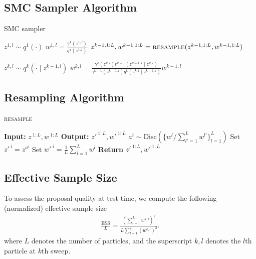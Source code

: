 \documentclass[anonymous=false, %
               format=acmsmall, %
               review=true, %
               screen=true, %
               nonacm=true]{acmart}
\theoremstyle{definition}
\begin{document}
\subsection{SMC Sampler Algorithm}
\label{appendix:smc-alg}
\begin{algorithm}[!h]
  \caption{SMC sampler}
  \label{alg:smcs}
\begin{algorithmic}[1]
    \small
        \State $z^{1,l} \sim q^1(\cdot)$
        \State $w^{1,l} = \frac{\gamma^1(z^{1,l})}{q^1(z^{1,l})}$
    \EndFor
      \State$z^{k-1,1:L}, w^{k-1,1:L}=\textsc{resample}(z^{k-1,1:L}, w^{k-1,1:L})$

          \State $z^{k,l} \sim q^k(\cdot \mid z^{k-1,l})$\label{line:apg-propose}
          \State $w^{k,l} = \frac{\gamma^k(z^{k,l}) r^{k-1}(z^{k-1,l} \mid z^{k,l})}{\gamma^{k-1}(z^{k-1,l}) q^k(z^{k,l} \mid z^{k-1,l})}w^{k-1,l}$
      \EndFor
    \EndFor
\end{algorithmic}
\end{algorithm}

\subsection{Resampling Algorithm}
\label{appendix:resample-alg}
\begin{algorithm}[!h]
  \caption{\textsc{resample}}
  \label{alg:resample}
\begin{algorithmic}[1]
\small
  \State \textbf{Input:} $z^{\:1:L}, w^{\:1:L}$
  \State \textbf{Output:} $z'^{\:1:L}, w'^{\:1:L}$
    \State $a^i \sim \mathrm{Disc}(\{w^l / \sum_{l' = 1}^L w^{l'}\}_{l=1}^L)$ 
    \State Set $ z'^{\:i} = z^{a^i}$
    \State Set $ w'^{\:i} = \frac{1}{L} \sum_{l = 1}^L w^l$
    \EndFor
  \State \textbf{Return} $z'^{\:1:L}, w'^{\:1:L}$
\end{algorithmic}
\end{algorithm}

\subsection{Effective Sample Size}
\label{appendix:ess}
To assess the proposal quality at test time, we compute the following (normalized) effective sample size
\begin{align}
\label{ess-eq}
    \frac{\text{ESS}}{L} 
    = 
    \frac{(\sum_{l=1}^L w^{k,l})^2}
         {L \sum_{l=1}^L (w^{k,l})^2}
    .
\end{align}
where $L$ denotes the number of particles, and the superscript $k, l$ denotes the $l$th particle at $k$th sweep.
\end{document}
